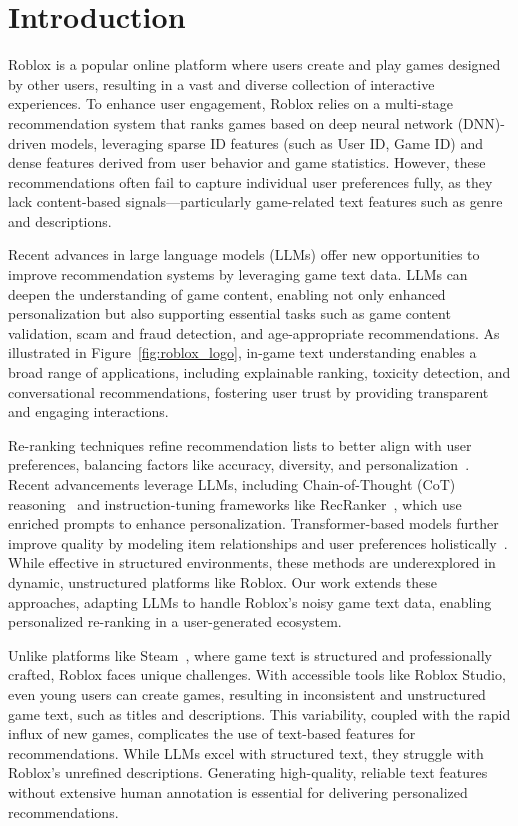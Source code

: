 \section{Introduction}

Roblox is a popular online platform where users create and play games designed by other users, resulting in a vast and diverse collection of interactive experiences. To enhance user engagement, Roblox relies on a multi-stage recommendation system that ranks games based on deep neural network (DNN)-driven models, leveraging sparse ID features (such as User ID, Game ID) and dense features derived from user behavior and game statistics. However, these recommendations often fail to capture individual user preferences fully, as they lack content-based signals—particularly game-related text features such as genre and descriptions.

Recent advances in large language models (LLMs) offer new opportunities to improve recommendation systems by leveraging game text data. LLMs can deepen the understanding of game content, enabling not only enhanced personalization but also supporting essential tasks such as game content validation, scam and fraud detection, and age-appropriate recommendations. As illustrated in Figure~\ref{fig:roblox_logo}, in-game text understanding enables a broad range of applications, including explainable ranking, toxicity detection, and conversational recommendations, fostering user trust by providing transparent and engaging interactions. 

Re-ranking techniques refine recommendation lists to better align with user preferences, balancing factors like accuracy, diversity, and personalization~\cite{gao2024llm, carraro2024enhancing}. Recent advancements leverage LLMs, including Chain-of-Thought (CoT) reasoning~\cite{gao2024llm} and instruction-tuning frameworks like RecRanker~\cite{luo2023recranker}, which use enriched prompts to enhance personalization. Transformer-based models further improve quality by modeling item relationships and user preferences holistically~\cite{gao2024llmenhancedrerankingrecommendersystems}. While effective in structured environments, these methods are underexplored in dynamic, unstructured platforms like Roblox. Our work extends these approaches, adapting LLMs to handle Roblox’s noisy game text data, enabling personalized re-ranking in a user-generated ecosystem.

Unlike platforms like Steam~\cite{yang2022large,cheuque2019recommender,pathak2017generating}, where game text is structured and professionally crafted, Roblox faces unique challenges. With accessible tools like Roblox Studio, even young users can create games, resulting in inconsistent and unstructured game text, such as titles and descriptions. This variability, coupled with the rapid influx of new games, complicates the use of text-based features for recommendations. While LLMs excel with structured text, they struggle with Roblox’s unrefined descriptions. Generating high-quality, reliable text features without extensive human annotation is essential for delivering personalized recommendations.

